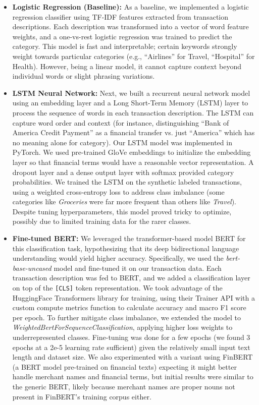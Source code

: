 \documentclass{scrartcl}
\begin{document}
\begin{itemize}
    \item \textbf{Logistic Regression (Baseline):} As a baseline, we implemented a logistic regression classifier using TF-IDF features extracted from transaction descriptions. Each description was transformed into a vector of word feature weights, and a one-vs-rest logistic regression was trained to predict the category. This model is fast and interpretable; certain keywords strongly weight towards particular categories (e.g., “Airlines” for Travel, “Hospital” for Health). However, being a linear model, it cannot capture context beyond individual words or slight phrasing variations.
    \item \textbf{LSTM Neural Network:} Next, we built a recurrent neural network model using an embedding layer and a Long Short-Term Memory (LSTM) layer to process the sequence of words in each transaction description. The LSTM can capture word order and context (for instance, distinguishing “Bank of America Credit Payment” as a financial transfer vs. just “America” which has no meaning alone for category). Our LSTM model was implemented in PyTorch. We used pre-trained GloVe embeddings to initialize the embedding layer so that financial terms would have a reasonable vector representation. A dropout layer and a dense output layer with softmax provided category probabilities. We trained the LSTM on the synthetic labeled transactions, using a weighted cross-entropy loss to address class imbalance (some categories like \textit{Groceries} were far more frequent than others like \textit{Travel}). Despite tuning hyperparameters, this model proved tricky to optimize, possibly due to limited training data for the rarer classes.
    \item \textbf{Fine-tuned BERT:} We leveraged the transformer-based model BERT for this classification task, hypothesizing that its deep bidirectional language understanding would yield higher accuracy. Specifically, we used the \textit{bert-base-uncased} model and fine-tuned it on our transaction data. Each transaction description was fed to BERT, and we added a classification layer on top of the \verb|[CLS]| token representation. We took advantage of the HuggingFace Transformers library for training, using their Trainer API with a custom compute metrics function to calculate accuracy and macro F1 score per epoch. To further mitigate class imbalance, we extended the model to \textit{WeightedBertForSequenceClassification}, applying higher loss weights to underrepresented classes. Fine-tuning was done for a few epochs (we found 3 epochs at a 2e-5 learning rate sufficient) given the relatively small input text length and dataset size. We also experimented with a variant using FinBERT (a BERT model pre-trained on financial texts) expecting it might better handle merchant names and financial terms, but initial results were similar to the generic BERT, likely because merchant names are proper nouns not present in FinBERT’s training corpus either.

\end{itemize}
\end{document}
